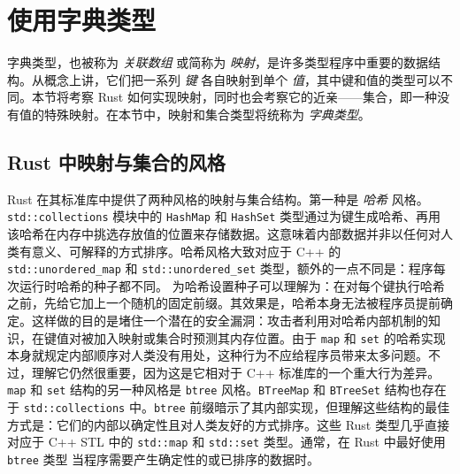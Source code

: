 \section{使用字典类型}
\label{idx:idx_ac7c6044}
\label{idx:idx_af8da15e}
\label{idx:idx_b33c3c56}
\label{idx:idx_3f072074}
字典类型，也被称为 \emph{关联数组} 或简称为 \emph{映射}，是许多类型程序中重要的数据结构。从概念上讲，它们把一系列 \emph{键} 各自映射到单个 \emph{值}，其中键和值的类型可以不同。本节将考察 Rust 如何实现映射，同时也会考察它的近亲——集合，即一种没有值的特殊映射。在本节中，映射和集合类型将统称为 \emph{字典类型}。
\subsection{Rust 中映射与集合的风格}
\label{idx:idx_9d892594}
Rust 在其标准库中提供了两种风格的映射与集合结构。第一种是 \emph{哈希} 风格。\texttt{std::\allowbreak{}collections} 模块中的 \texttt{HashMap} 和 \texttt{HashSet} 类型通过为键生成哈希、再用该哈希在内存中挑选存放值的位置来存储数据。这意味着内部数据并非以任何对人类有意义、可解释的方式排序。哈希风格大致对应于 C++ 的 \texttt{std::\allowbreak{}unordered\_\allowbreak{}map} 和 \texttt{std::\allowbreak{}unordered\_\allowbreak{}set} 类型，额外的一点不同是：程序每次运行时哈希的种子都不同。
为哈希设置种子可以理解为：在对每个键执行哈希之前，先给它加上一个随机的固定前缀。其效果是，哈希本身无法被程序员提前确定。这样做的目的是堵住一个潜在的安全漏洞：攻击者利用对哈希内部机制的知识，在键值对被加入映射或集合时预测其内存位置。由于 \texttt{map} 和 \texttt{set} 的哈希实现本身就规定内部顺序对人类没有用处，这种行为不应给程序员带来太多问题。不过，理解它仍然很重要，因为这是它相对于 C++ 标准库的一个重大行为差异。
\texttt{map} 和 \texttt{set} 结构的另一种风格是 \texttt{btree} 风格。\texttt{BTreeMap} 和 \texttt{BTreeSet} 结构也存在于 \texttt{std::\allowbreak{}collections} 中。\texttt{btree} 前缀暗示了其内部实现，但理解这些结构的最佳方式是：它们的内部以确定性且对人类友好的方式排序。这些 Rust 类型几乎直接对应于
C++ STL 中的 \texttt{std::map} 和 \texttt{std::set} 类型。通常，在 Rust 中最好使用 \texttt{btree} 类型
当程序需要产生确定性的或已排序的数据时。
